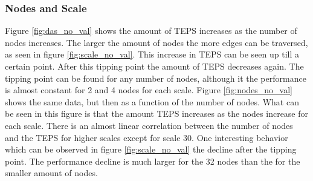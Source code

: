 \subsubsection{Nodes and Scale}
\label{res:nodes_scale}
Figure \ref{fig:das_no_val} shows the amount of TEPS increases as the number of nodes increases. The larger the amount of nodes the more edges can be traversed, as seen in figure \ref{fig:scale_no_val}. This increase in TEPS can be seen up till a certain point. After this tipping point the amount of TEPS decreases again. The tipping point can be found for any number of nodes, although it the performance is almost constant for 2 and 4 nodes for each scale.
Figure \ref{fig:nodes_no_val} shows the same data, but then as a function of the number of nodes. What can be seen in this figure is that the amount TEPS increases as the nodes increase for each scale. There is an almost linear correlation between the number of nodes and the TEPS for higher scales except for scale 30. One interesting behavior which can be observed in figure \ref{fig:scale_no_val} the decline after the tipping point. The performance decline is much larger for the 32 nodes than the for the smaller amount of nodes.



